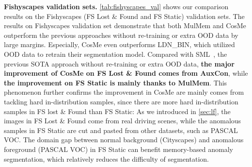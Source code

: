 \documentclass[10pt,twocolumn,letterpaper]{article}
\begin{document}
\noindent\textbf{Fishyscapes validation sets.}
\label{sec:fvs}
\cref{tab:fishyscapes_val} shows our comparison results on the Fishyscapes (FS Lost \& Found and FS Static) validation sets. The results on Fishyscapes validation set demonstrate that both MulMem and CosMe outperform the previous approaches without re-training or extra OOD data by large margins. Especially, CosMe even outperforms LDN\_BIN, which utilized OOD data to retrain their segmentation model. Compared with SML~\cite{SML}, the previous SOTA approach without re-training or extra OOD data, \textbf{the major improvement of CosMe on FS Lost \& Found comes from AuxCon}, while \textbf{the improvement on FS Static is mainly thanks to MulMem}. This phenomenon further confirms the improvement in CosMe are mainly comes from tackling hard in-distribution samples, since there are more hard in-distribution samples in FS lost \& Found than FS Static: As we introduced in \cref{sec:lf}, the images in FS Lost \& Found come from real driving scenes, while the anomalous samples in FS Static are cut and pasted from other datasets, such as PASCAL VOC. The domain gap between normal background (Cityscapes) and anomalous foreground (PASCAL VOC) in FS Static can benefit memory-based anomaly segmentation, which relatively reduces the difficulty of segmentation.



\begin{table}[ht!]
  \centering
  \caption{Comparison results on Streethazards.  and  indicate re-training and extra OOD data, respectively.}
  \label{tab:streethazards}
  \vspace{-2mm}
\end{table}
\end{document}
